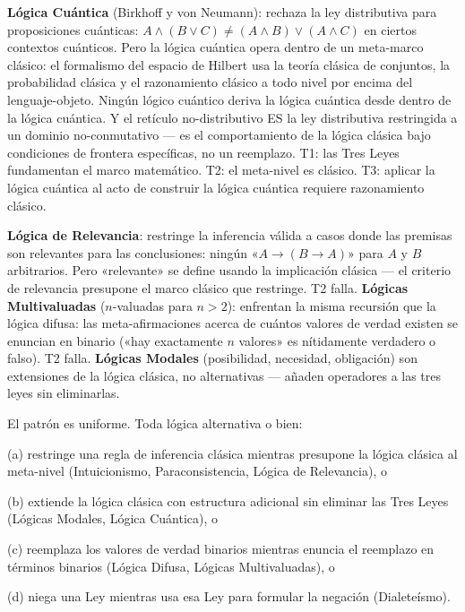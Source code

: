 \documentclass[10pt, openany, oneside]{book}
\begin{document}
\textbf{Lógica Cuántica} (Birkhoff y von Neumann): rechaza la ley distributiva para proposiciones cuánticas: $A \wedge (B \vee C) \neq (A \wedge B) \vee (A \wedge C)$ en ciertos contextos cuánticos. Pero la lógica cuántica opera dentro de un meta-marco clásico: el formalismo del espacio de Hilbert usa la teoría clásica de conjuntos, la probabilidad clásica y el razonamiento clásico a todo nivel por encima del lenguaje-objeto. Ningún lógico cuántico deriva la lógica cuántica desde dentro de la lógica cuántica. Y el retículo no-distributivo ES la ley distributiva restringida a un dominio no-conmutativo --- es el comportamiento de la lógica clásica bajo condiciones de frontera específicas, no un reemplazo. T1: las Tres Leyes fundamentan el marco matemático. T2: el meta-nivel es clásico. T3: aplicar la lógica cuántica al acto de construir la lógica cuántica requiere razonamiento clásico.

\textbf{Lógica de Relevancia}: restringe la inferencia válida a casos donde las premisas son relevantes para las conclusiones: ningún «$A \to (B \to A)$» para $A$ y $B$ arbitrarios. Pero «relevante» se define usando la implicación clásica --- el criterio de relevancia presupone el marco clásico que restringe. T2 falla. \textbf{Lógicas Multivaluadas} ($n$-valuadas para $n > 2$): enfrentan la misma recursión que la lógica difusa: las meta-afirmaciones acerca de cuántos valores de verdad existen se enuncian en binario («hay exactamente $n$ valores» es nítidamente verdadero o falso). T2 falla. \textbf{Lógicas Modales} (posibilidad, necesidad, obligación) son extensiones de la lógica clásica, no alternativas --- añaden operadores a las tres leyes sin eliminarlas.

El patrón es uniforme. Toda lógica alternativa o bien:

\vspace{0.3em}

\noindent (a) restringe una regla de inferencia clásica mientras presupone la lógica clásica al meta-nivel (Intuicionismo, Paraconsistencia, Lógica de Relevancia), o

\noindent (b) extiende la lógica clásica con estructura adicional sin eliminar las Tres Leyes (Lógicas Modales, Lógica Cuántica), o

\noindent (c) reemplaza los valores de verdad binarios mientras enuncia el reemplazo en términos binarios (Lógica Difusa, Lógicas Multivaluadas), o

\noindent (d) niega una Ley mientras usa esa Ley para formular la negación (Dialeteísmo).
\end{document}
